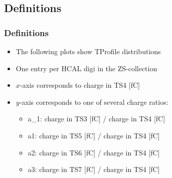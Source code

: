 \documentclass[bigger]{beamer}
\begin{document}
\subsection{Definitions}
\label{sec-3-2}
\begin{frame}
\frametitle{Definitions}
\label{sec-3-2-1}
\begin{itemize}

\item The following plots show TProfile distributions
\label{sec-3-2-1-1}%

\item One entry per HCAL digi in the ZS-collection
\label{sec-3-2-1-2}%

\item $x$-axis corresponds to charge in TS4 [fC]
\label{sec-3-2-1-3}%

\item $y$-axis corresponds to one of several charge ratios:
\label{sec-3-2-1-4}%
\begin{itemize}

\item a\_1: charge in TS3 [fC] / charge in TS4 [fC]
\label{sec-3-2-1-4-1}%

\item a1: charge in TS5 [fC] / charge in TS4 [fC]
\label{sec-3-2-1-4-2}%

\item a2: charge in TS6 [fC] / charge in TS4 [fC]
\label{sec-3-2-1-4-3}%

\item a3: charge in TS7 [fC] / charge in TS4 [fC]
\label{sec-3-2-1-4-4}%
\end{itemize} %
\end{itemize} %
\end{frame}
\end{document}
